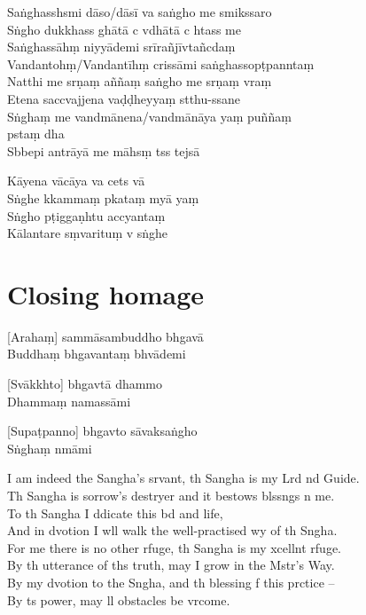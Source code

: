 \enlargethispage{\baselineskip}
\clearpage

Saṅghasshsmi dāso/dāsī va saṅgho me smikssaro\\%
Sṅgho dukkhass ghātā c vdhātā c htass me\\
Saṅghassāhṃ niyyādemi srīrañjīvtañcdaṃ\\
Vandantohṃ/Vandantīhṃ crissāmi saṅghassopṭpanntaṃ\\
Natthi me srṇaṃ aññaṃ saṅgho me srṇaṃ vraṃ\\
Etena saccvajjena vaḍḍheyyaṃ stthu-ssane\\
Sṅghaṃ me vandmānena/vandmānāya yaṃ puññaṃ\\
pstaṃ dha\\
Sbbepi antrāyā me māhsṃ tss tejsā


Kāyena vācāya va cets vā\\
Sṅghe kkammaṃ pkataṃ myā yaṃ\\
Sṅgho pṭiggaṇhtu accyantaṃ\\
Kālantare sṃvarituṃ v sṅghe

\chapter{Closing homage}%

[Arahaṃ] sammāsambuddho bhgavā\\
Buddhaṃ bhgavantaṃ bhvādemi 

[Svākkhto] bhgavtā dhammo\\
Dhammaṃ namassāmi 

[Supaṭpanno] bhgavto sāvaksaṅgho\\
Sṅghaṃ nmāmi 

\clearpage

I am indeed the Sangha's srvant, th Sangha is my Lrd nd Guide.\\%
Th Sangha is sorrow's destryer and it bestows blssngs n me.\\
To th Sangha I ddicate this bd and life,\\
And in dvotion I wll walk the well-practised wy of th Sngha.\\
For me there is no other rfuge, th Sangha is my xcellnt rfuge.\\
By th utterance of ths truth, may I grow in the Mstr's Way.\\
By my dvotion to the Sngha, and th blessing f this prctice --\\
By ts power, may ll obstacles be vrcome.

